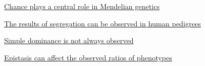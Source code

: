 \documentclass[12pt,letterpaper]{article}
\begin{document}
\hypertarget{2.4}{}
\begin{secbox}{\hyperlink{2}{Chance plays a central role in Mendelian genetics}}{

}\end{secbox}
\hypertarget{2.5}{}
\begin{secbox}{\hyperlink{2}{The results of segregation can be observed in human pedigrees}}{

}\end{secbox}
\hypertarget{2.6}{}
\begin{secbox}{\hyperlink{2}{Simple dominance is not always observed}}{

}\end{secbox}
\hypertarget{2.7}{}
\begin{secbox}{\hyperlink{2}{Epistasis can affect the observed ratios of phenotypes}}{

}\end{secbox}
\end{document}
